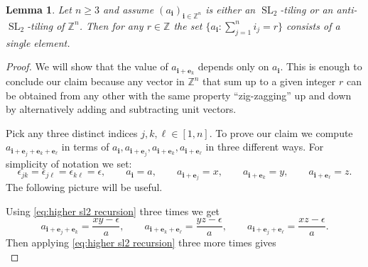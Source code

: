 \documentclass[12pt]{amsart}
\newtheorem{lemma}[theorem]{Lemma}
\newcommand{\be}{\boldsymbol{e}}
\newcommand{\bi}{\boldsymbol{i}}
\newcommand{\SL}{\operatorname{SL}}
\newcommand{\ZZ}{\mathbb{Z}}
\begin{document}
  \begin{lemma}\label{le:constant slices}
    Let $n\ge 3$ and assume $(a_{\bi})_{\bi\in\ZZ^n}$ is either an $\SL_2$-tiling or an anti-$\SL_2$-tiling of $\ZZ^n$.
    Then for any $r\in\ZZ$ the set $\{a_{\bi}: \sum_{j=1}^n i_j=r\}$ consists of a single element.
  \end{lemma}
  \begin{proof}
    We will show that the value of $a_{\bi+\be_k}$ depends only on $a_{\bi}$. 
    This is enough to conclude our claim because any vector in $\ZZ^n$ that sum up to a given integer $r$ can be obtained  from any other with the same property ``zig-zagging'' up and down by alternatively adding and subtracting unit vectors.

    Pick any three distinct indices $j,k,\ell\in[1,n]$.
    To prove our claim we compute $a_{\bi+\be_j+\be_k+\be_\ell}$ in terms of $a_{\bi}, a_{\bi+\be_j}, a_{\bi+\be_k}, a_{\bi+\be_\ell}$ in three different ways.
    For simplicity of notation we set:
    \[
      \epsilon_{jk}=\epsilon_{j\ell}=\epsilon_{k\ell}=\epsilon,
      \quad\quad 
      a_{\bi}=a,
      \quad\quad 
      a_{\bi+\be_j}=x,
      \quad\quad 
      a_{\bi+\be_k}=y,
      \quad\quad 
      a_{\bi+\be_\ell}=z.
    \]
    The following picture will be useful.
    \begin{center}
    \end{center}
    Using \eqref{eq:higher sl2 recursion} three times we get
    \[
      a_{\bi+\be_j+\be_k}=\frac{xy-\epsilon}{a},
      \quad\quad 
      a_{\bi+\be_k+\be_\ell}=\frac{yz-\epsilon}{a},
      \quad\quad 
      a_{\bi+\be_j+\be_\ell}=\frac{xz-\epsilon}{a}.
    \]
    Then applying \eqref{eq:higher sl2 recursion} three more times gives 
    \begin{equation*}

\end{equation*}
\end{proof}
\end{document}
